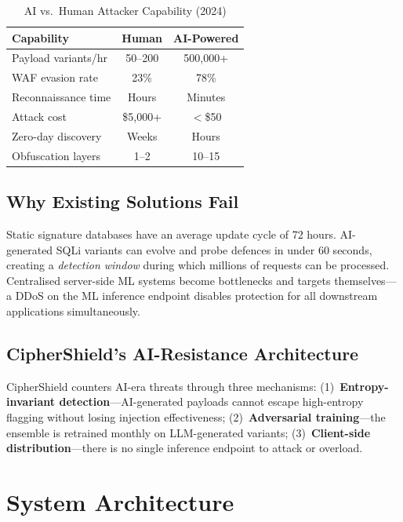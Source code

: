 \documentclass[10pt,twocolumn]{article}
\begin{document}
\begin{table}[H]
\centering
\caption{AI vs.\ Human Attacker Capability (2024)}
\label{tab:ai_impact}
\small
\setlength{\tabcolsep}{4pt}
\begin{tabular}{@{}lcc@{}}
\toprule
\textbf{Capability} & \textbf{Human} & \textbf{AI-Powered} \\
\midrule
Payload variants/hr    & 50--200     & 500{,}000+  \\
WAF evasion rate       & 23\%        & 78\%        \\
Reconnaissance time    & Hours       & Minutes     \\
Attack cost            & \$5{,}000+  & $<$\$50     \\
Zero-day discovery     & Weeks       & Hours       \\
Obfuscation layers     & 1--2        & 10--15      \\
\bottomrule
\end{tabular}
\end{table}

\subsection{Why Existing Solutions Fail}

Static signature databases have an average update cycle of 72 hours.
AI-generated SQLi variants can evolve and probe defences in under 60
seconds, creating a \emph{detection window} during which millions of
requests can be processed. Centralised server-side ML systems become
bottlenecks and targets themselves---a DDoS on the ML inference endpoint
disables protection for all downstream applications simultaneously.

\subsection{CipherShield's AI-Resistance Architecture}

CipherShield counters AI-era threats through three mechanisms:
(1)~\textbf{Entropy-invariant detection}---AI-generated payloads cannot
escape high-entropy flagging without losing injection effectiveness;
(2)~\textbf{Adversarial training}---the ensemble is retrained monthly on
LLM-generated variants; (3)~\textbf{Client-side distribution}---there is
no single inference endpoint to attack or overload.

\section{System Architecture}
\label{sec:arch}
\end{document}
